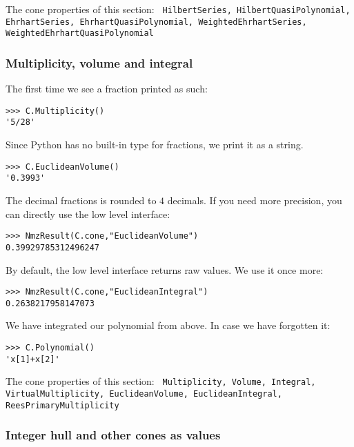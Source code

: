 \documentclass[12pt,a4paper]{scrartcl}
\theoremstyle{definition}
\def\ttt{\texttt}
\begin{document}
\begin{small}
The cone properties of this section: \ttt{    HilbertSeries,
	HilbertQuasiPolynomial,
	EhrhartSeries,
	EhrhartQuasiPolynomial,
	WeightedEhrhartSeries,
	WeightedEhrhartQuasiPolynomial}

\subsubsection{Multiplicity, volume and integral}
The first time we see a fraction printed as such:
\begin{Verbatim}
>>> C.Multiplicity()
'5/28'
\end{Verbatim}
Since Python has no built-in type for fractions, we print it as a string.

\begin{Verbatim}
>>> C.EuclideanVolume()
'0.3993'
\end{Verbatim}
The decimal fractions is rounded to $4$ decimals. If you need more precision, you can directly use the low level interface:
\begin{Verbatim}
>>> NmzResult(C.cone,"EuclideanVolume")
0.39929785312496247
\end{Verbatim}
By default, the low level interface returns raw values. We use it once more:
\begin{Verbatim}
>>> NmzResult(C.cone,"EuclideanIntegral")
0.2638217958147073
\end{Verbatim}
We have integrated our polynomial from above. In case we have forgotten it:
\begin{Verbatim}
>>> C.Polynomial()
'x[1]+x[2]'
\end{Verbatim}

The cone properties of this section: \ttt{    Multiplicity,
	Volume,
	Integral,
	VirtualMultiplicity,
	EuclideanVolume,
	EuclideanIntegral,
	ReesPrimaryMultiplicity
}

\subsubsection{Integer hull and other cones as values}


\end{small}
\end{document}
